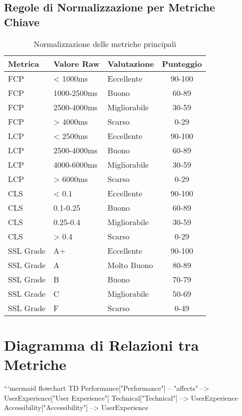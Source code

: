 {{{{{{{\subsection{Regole di Normalizzazione per Metriche Chiave}
\begin{table}[H]
\centering
\begin{tabular}{|l|l|l|c|}
\hline
\textbf{Metrica} & \textbf{Valore Raw} & \textbf{Valutazione} & \textbf{Punteggio} \\
\hline
FCP & < 1000ms & Eccellente & 90-100 \\
\hline
FCP & 1000-2500ms & Buono & 60-89 \\
\hline
FCP & 2500-4000ms & Migliorabile & 30-59 \\
\hline
FCP & > 4000ms & Scarso & 0-29 \\
\hline
LCP & < 2500ms & Eccellente & 90-100 \\
\hline
LCP & 2500-4000ms & Buono & 60-89 \\
\hline
LCP & 4000-6000ms & Migliorabile & 30-59 \\
\hline
LCP & > 6000ms & Scarso & 0-29 \\
\hline
CLS & < 0.1 & Eccellente & 90-100 \\
\hline
CLS & 0.1-0.25 & Buono & 60-89 \\
\hline
CLS & 0.25-0.4 & Migliorabile & 30-59 \\
\hline
CLS & > 0.4 & Scarso & 0-29 \\
\hline
SSL Grade & A+ & Eccellente & 90-100 \\
\hline
SSL Grade & A & Molto Buono & 80-89 \\
\hline
SSL Grade & B & Buono & 70-79 \\
\hline
SSL Grade & C & Migliorabile & 50-69 \\
\hline
SSL Grade & F & Scarso & 0-49 \\
\hline
\end{tabular}
\caption{Normalizzazione delle metriche principali}
\label{table:normalization-rules}
\end{table}

\section{Diagramma di Relazioni tra Metriche}

```mermaid
flowchart TD
    Performance["Performance"] -- "affects" --> UserExperience["User Experience"]
    Technical["Technical"] --> UserExperience
    Accessibility["Accessibility"] --> UserExperience
    
}}}}}}}

